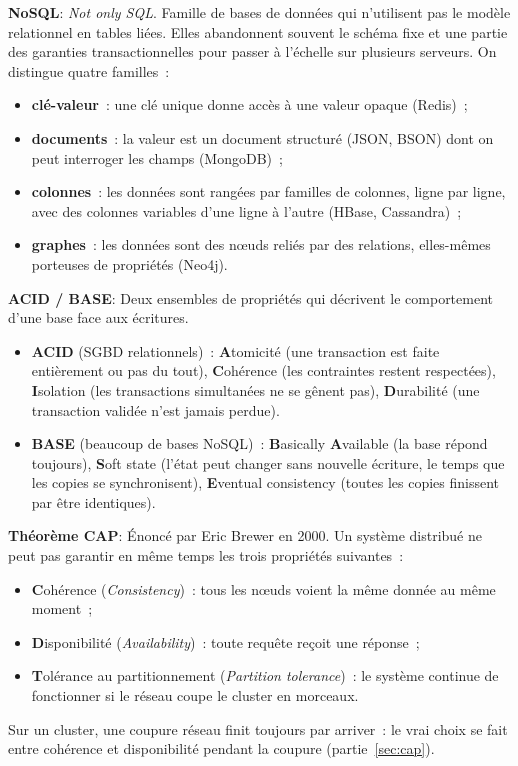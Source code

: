 \noindent \textbf{NoSQL}:
\noindent \textit{Not only SQL}. Famille de bases de données qui n'utilisent pas le modèle relationnel en tables liées. Elles abandonnent souvent le schéma fixe et une partie des garanties transactionnelles pour passer à l'échelle sur plusieurs serveurs. On distingue quatre familles~:
\begin{itemize}
	\item \textbf{clé-valeur}~: une clé unique donne accès à une valeur opaque (Redis)~;
	\item \textbf{documents}~: la valeur est un document structuré (JSON, BSON) dont on peut interroger les champs (MongoDB)~;
	\item \textbf{colonnes}~: les données sont rangées par familles de colonnes, ligne par ligne, avec des colonnes variables d'une ligne à l'autre (HBase, Cassandra)~;
	\item \textbf{graphes}~: les données sont des n\oe uds reliés par des relations, elles-mêmes porteuses de propriétés (Neo4j).
\end{itemize}

\separateur

\noindent \textbf{ACID / BASE}:
\noindent Deux ensembles de propriétés qui décrivent le comportement d'une base face aux écritures.
\begin{itemize}
	\item \textbf{ACID} (SGBD relationnels)~: \textbf{A}tomicité (une transaction est faite entièrement ou pas du tout), \textbf{C}ohérence (les contraintes restent respectées), \textbf{I}solation (les transactions simultanées ne se gênent pas), \textbf{D}urabilité (une transaction validée n'est jamais perdue).
	\item \textbf{BASE} (beaucoup de bases NoSQL)~: \textbf{B}asically \textbf{A}vailable (la base répond toujours), \textbf{S}oft state (l'état peut changer sans nouvelle écriture, le temps que les copies se synchronisent), \textbf{E}ventual consistency (toutes les copies finissent par être identiques).
\end{itemize}

\separateur

\noindent \textbf{Théorème CAP}:
\noindent Énoncé par Eric Brewer en 2000. Un système distribué ne peut pas garantir en même temps les trois propriétés suivantes~:
\begin{itemize}
	\item \textbf{C}ohérence (\textit{Consistency})~: tous les n\oe uds voient la même donnée au même moment~;
	\item \textbf{D}isponibilité (\textit{Availability})~: toute requête reçoit une réponse~;
	\item \textbf{T}olérance au partitionnement (\textit{Partition tolerance})~: le système continue de fonctionner si le réseau coupe le cluster en morceaux.
\end{itemize}
Sur un cluster, une coupure réseau finit toujours par arriver~: le vrai choix se fait entre cohérence et disponibilité pendant la coupure (partie~\ref{sec:cap}).

